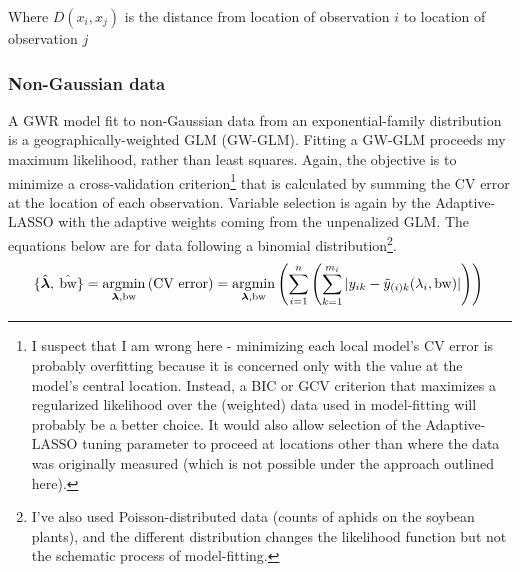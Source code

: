 \documentclass[10pt]{amsart}
\DeclareMathOperator*{\argmin}{\arg\!\min}
\DeclareMathOperator*{\bw}{\mbox{bw}}
\newcommand{\vect}[1]{\boldsymbol{#1}}
\begin{document}
		Where $D(x_i,x_j)$ is the distance from location of observation $i$ to location of observation $j$\\
		
		\subsubsection{Non-Gaussian data} A GWR model fit to non-Gaussian data from an exponential-family distribution is a geographically-weighted GLM (GW-GLM). Fitting a GW-GLM proceeds my maximum likelihood, rather than least squares. Again, the objective is to minimize a cross-validation criterion\footnote{I suspect that I am wrong here - minimizing each local model's CV error is probably overfitting because it is concerned only with the value at the model's central location. Instead, a BIC or GCV criterion that maximizes a regularized likelihood over the (weighted) data used in model-fitting will probably be a better choice. It would also allow selection of the Adaptive-LASSO tuning parameter to proceed at locations other than where the data was originally measured (which is not possible under the approach outlined here).} that is calculated by summing the CV error at the location of each observation. Variable selection is again by the Adaptive-LASSO with the adaptive weights coming from the unpenalized GLM. The equations below are for data following a binomial distribution\footnote{I've also used Poisson-distributed data (counts of aphids on the soybean plants), and the different distribution changes the likelihood function but not the schematic process of model-fitting.}.	
		\[
			\{ \hat{\vect{\lambda}}, \: \hat{\bw} \} = \argmin_{\vect{\lambda}, \text{bw}} \left( \mbox{CV error} \right)  = \argmin_{\vect{\lambda}, \text{bw}} \left( \sum_{i = 1}^n \left( \sum_{k=1}^{m_i} |y_{ik}-\tilde{y}_{(i)k}(\lambda_i, \bw)| \right) \right)\\
		\]	
		
\end{document}
